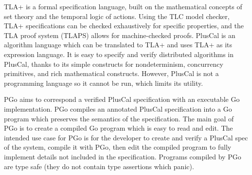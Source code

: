 TLA+ is a formal specification language, built on the mathematical concepts of set theory and the temporal logic of actions. Using the TLC model checker, TLA+ specifications can be checked exhaustively for specific properties, and the TLA proof system (TLAPS) allows for machine-checked proofs. PlusCal is an algorithm language which can be translated to TLA+ and uses TLA+ as its expression language. It is easy to specify and verify distributed algorithms in PlusCal, thanks to its simple constructs for nondeterminism, concurrency primitives, and rich mathematical constructs. However, PlusCal is not a programming language so it cannot be run, which limits its utility.

PGo aims to correspond a verified PlusCal specification with an executable Go implementation. PGo compiles an annotated PlusCal specification into a Go program which preserves the semantics of the specification. The main goal of PGo is to create a compiled Go program which is easy to read and edit. The intended use case for PGo is for the developer to create and verify a PlusCal spec of the system, compile it with PGo, then edit the compiled program to fully implement details not included in the specification. Programs compiled by PGo are type safe (they do not contain type assertions which panic).
